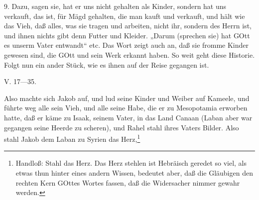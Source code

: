 9. Dazu, sagen sie, hat er uns nicht gehalten als Kinder, sondern hat uns verkauft, das ist, für Mägd gehalten, die man kauft und verkauft, und hält wie das Vieh, daß alles, was sie tragen und arbeiten, nicht ihr, sondern des Herrn ist, und ihnen nichts gibt denn Futter und Kleider. „Darum (sprechen sie) hat GOtt es unserm Vater entwandt“ etc. Das Wort zeigt auch an, daß sie fromme Kinder gewesen sind, die GOtt und sein Werk erkannt haben. So weit geht diese Historie. Folgt nun ein ander Stück, wie es ihnen auf der Reise gegangen ist.

\begin{schriftzitat}
V. 17—35.

Also machte sich Jakob auf, und lud seine Kinder und Weiber auf Kameele, und führte weg alle sein Vieh, und alle seine Habe, die er zu Mesopotamia erworben hatte, daß er käme zu Isaak, seinem Vater, in das Land Canaan (Laban aber war gegangen seine Heerde zu scheren), und Rahel stahl ihres Vaters Bilder. Also stahl Jakob dem Laban zu Syrien das Herz,\footnote{Handloß: Stahl das Herz. Das Herz stehlen ist Hebräisch geredet so viel, als etwas thun hinter eines andern Wissen, bedeutet aber, daß die Gläubigen den rechten Kern GOttes Wortes fassen, daß die Widersacher nimmer gewahr werden.}

\end{schriftzitat}
